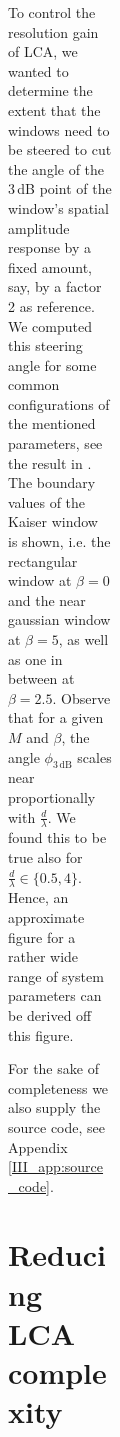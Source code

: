 \begin{figure}[tbp]
\begin{figure}[tbp]
\begin{figure}[t]
\begin{figure}[tbp]
\begin{figure}[tb]
To control the resolution gain of LCA, we wanted to determine the extent that the windows need to be steered to cut the angle of the \minus{}3\,dB point of the window's spatial amplitude response by a fixed amount, say, by a factor 2 as reference. We computed this steering angle for some common configurations of the mentioned parameters, see the result in . The boundary values of the Kaiser window is shown, i.e. the rectangular window at $\beta=0$ and the near gaussian window at $\beta=5$, as well as one in between at $\beta=2.5$. Observe that for a given $M$ and $\beta$, the angle $\phi_\mathrm{3\,dB}$ scales near proportionally with $\frac{d}{\lambda}$. We found this to be true also for $\frac{d}{\lambda}\in\{0.5,4\}$. Hence, an approximate figure for a rather wide range of system parameters can be derived off this figure.

For the sake of completeness we also supply the source code, see Appendix \ref{III_app:source_code}.


\section{Reducing LCA complexity}\label{III_sec:reducing_lca_complexity}

\renewcommand\b{\vec b}


\end{figure}
\end{figure}
\end{figure}
\end{figure}
\end{figure}
